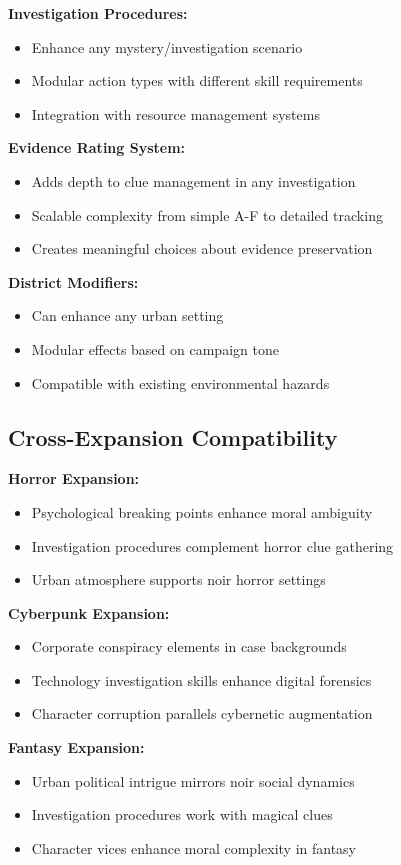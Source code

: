 \documentclass[11pt]{article}
\begin{document}
\textbf{Investigation Procedures:}
\begin{itemize}
\item Enhance any mystery/investigation scenario
\item Modular action types with different skill requirements
\item Integration with resource management systems
\end{itemize}

\textbf{Evidence Rating System:}
\begin{itemize}
\item Adds depth to clue management in any investigation
\item Scalable complexity from simple A-F to detailed tracking
\item Creates meaningful choices about evidence preservation
\end{itemize}

\textbf{District Modifiers:}
\begin{itemize}
\item Can enhance any urban setting
\item Modular effects based on campaign tone
\item Compatible with existing environmental hazards
\end{itemize}

\subsection{Cross-Expansion Compatibility}

\textbf{Horror Expansion:}
\begin{itemize}
\item Psychological breaking points enhance moral ambiguity
\item Investigation procedures complement horror clue gathering
\item Urban atmosphere supports noir horror settings
\end{itemize}

\textbf{Cyberpunk Expansion:}
\begin{itemize}
\item Corporate conspiracy elements in case backgrounds
\item Technology investigation skills enhance digital forensics
\item Character corruption parallels cybernetic augmentation
\end{itemize}

\textbf{Fantasy Expansion:}
\begin{itemize}
\item Urban political intrigue mirrors noir social dynamics
\item Investigation procedures work with magical clues
\item Character vices enhance moral complexity in fantasy
\end{itemize}
\end{document}
